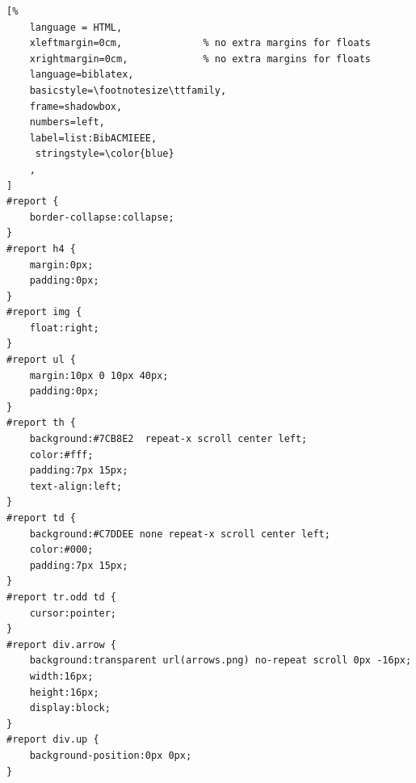 \begin{lstlisting}[%
    language = HTML, 
    xleftmargin=0cm,              % no extra margins for floats
    xrightmargin=0cm,             % no extra margins for floats
    language=biblatex,
    basicstyle=\footnotesize\ttfamily,
    frame=shadowbox,
    numbers=left,
    label=list:BibACMIEEE,
     stringstyle=\color{blue}
    ,
]
#report {
    border-collapse:collapse;
}
#report h4 {
    margin:0px;
    padding:0px;
}
#report img {
    float:right;
}
#report ul {
    margin:10px 0 10px 40px;
    padding:0px;
}
#report th {
    background:#7CB8E2  repeat-x scroll center left;
    color:#fff;
    padding:7px 15px;
    text-align:left;
}
#report td {
    background:#C7DDEE none repeat-x scroll center left;
    color:#000;
    padding:7px 15px;
}
#report tr.odd td {
    cursor:pointer;
}
#report div.arrow {
    background:transparent url(arrows.png) no-repeat scroll 0px -16px;
    width:16px;
    height:16px;
    display:block;
}
#report div.up {
    background-position:0px 0px;
}
\end{lstlisting}


